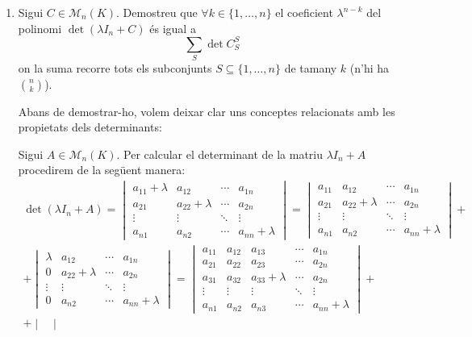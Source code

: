\documentclass[11pt,a4paper]{article}
\begin{document}
\begin{enumerate}
    \item Sigui $C\in \mathcal{M}_n(K)$. Demostreu que $\forall k \in \{1,\ldots,n\}$ el coeficient $\lambda^{n-k}$ del polinomi $\det (\lambda I_n+C)$ és igual a $$\sum_S\det C_S^S$$ on la suma recorre tots els subconjunts $S\subseteq \{1,\ldots,n\}$ de tamany $k$ (n'hi ha $\binom{n}{k}$).\par
    Abans de demostrar-ho, volem deixar clar uns conceptes relacionats amb les propietats dels determinants: \par Sigui $A\in \mathcal{M}_n(K)$. Per calcular el determinant de la matriu $\lambda I_n +A$ procedirem de la següent manera: 
    \begin{multline*}
        \det(\lambda I_n +A)=\begin{vmatrix}
      a_{11}+\lambda & a_{12} & \cdots & a_{1n} \\
      a_{21} & a_{22}+\lambda & \cdots & a_{2n} \\
      \vdots & \vdots & \ddots & \vdots \\
      a_{n1} & a_{n2} & \cdots & a_{nn}+\lambda
   \end{vmatrix}=\begin{vmatrix}
      a_{11} & a_{12} &\cdots & a_{1n} \\
      a_{21} & a_{22}+\lambda & \cdots & a_{2n} \\
      \vdots & \vdots & \ddots & \vdots \\
      a_{n1} & a_{n2} & \cdots & a_{nn}+\lambda
   \end{vmatrix}+\\+\begin{vmatrix}
      \lambda & a_{12} & \cdots & a_{1n} \\
      0 & a_{22}+\lambda & \cdots & a_{2n} \\
      \vdots & \vdots & \ddots & \vdots \\
      0 & a_{n2} & \cdots & a_{nn}+\lambda
   \end{vmatrix}=\begin{vmatrix}
      a_{11} & a_{12} & a_{13} &\cdots & a_{1n} \\
      a_{21} & a_{22} & a_{23} & \cdots & a_{2n} \\
      a_{31} & a_{32} & a_{33}+\lambda & \cdots & a_{2n} \\
      \vdots & \vdots & \vdots & \ddots & \vdots \\
      a_{n1} & a_{n2} & a_{n3}& \cdots & a_{nn}+\lambda
   \end{vmatrix}+\\+\begin{vmatrix}

\end{vmatrix}
\end{multline*}
\end{enumerate}
\end{document}
